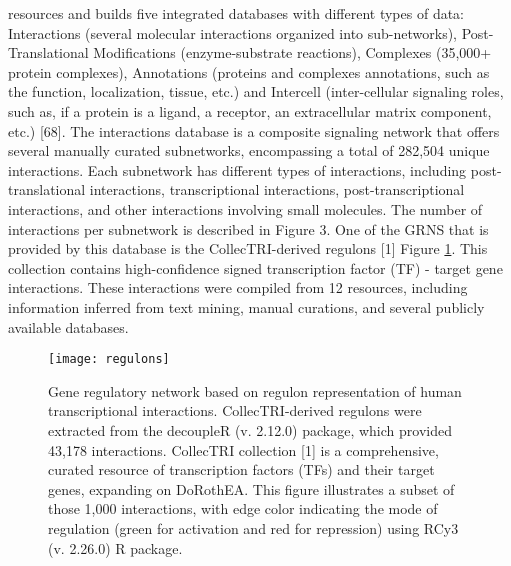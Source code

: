 resources and builds five integrated databases with different types of data: Interactions (several molecular interactions organized into sub-networks), Post-Translational Modifications (enzyme-substrate reactions), Complexes (35,000+ protein complexes), Annotations (proteins and complexes annotations, such as the function, localization, tissue, etc.) and Intercell (inter-cellular signaling roles, such as, if a protein is a ligand, a receptor, an extracellular matrix component,  etc.) [68]. The interactions database is a composite signaling network that offers several manually curated subnetworks, encompassing a total of 282,504 unique interactions. Each subnetwork has different types of interactions, including post-translational interactions, transcriptional interactions, post-transcriptional interactions, and other interactions involving small molecules. The number of interactions per subnetwork is described in Figure 3. One of the GRNS that is provided by this database is the CollecTRI-derived regulons [1] Figure \ref{fig:regulons}. This collection contains high-confidence signed transcription factor (TF) - target gene interactions. These interactions were compiled from 12 resources, including information inferred from text mining, manual curations, and several publicly available databases.

\begin{figure}[htbp]
    \centering
    \texttt{[image: regulons]}
    \caption{Gene regulatory network based on regulon representation of human transcriptional interactions. CollecTRI-derived regulons were extracted from the decoupleR (v. 2.12.0) package, which provided 43,178 interactions. CollecTRI collection [1] is a comprehensive, curated resource of transcription factors (TFs) and their target genes, expanding on DoRothEA. This figure illustrates a subset of those 1,000 interactions, with edge color indicating the mode of regulation (green for activation and red for repression) using RCy3 (v. 2.26.0) R package.}
    \label{fig:regulons}
\end{figure}

